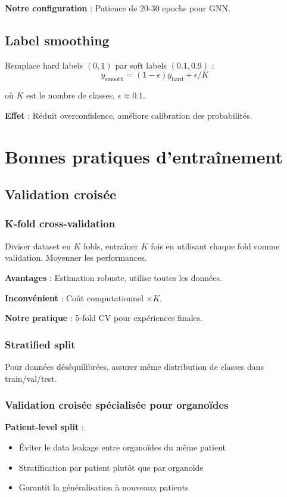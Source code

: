 \textbf{Notre configuration} : Patience de 20-30 epochs pour GNN.

\subsection{Label smoothing}

Remplace hard labels $(0, 1)$ par soft labels $(0.1, 0.9)$ :
\[
y_{\text{smooth}} = (1 - \epsilon) y_{\text{hard}} + \epsilon / K
\]

où $K$ est le nombre de classes, $\epsilon \approx 0.1$.

\textbf{Effet} : Réduit overconfidence, améliore calibration des probabilités.

\section{Bonnes pratiques d'entraînement}

\subsection{Validation croisée}

\subsubsection{K-fold cross-validation}

Diviser dataset en $K$ folds, entraîner $K$ fois en utilisant chaque fold comme validation. Moyenner les performances.

\textbf{Avantages} : Estimation robuste, utilise toutes les données.

\textbf{Inconvénient} : Coût computationnel $\times K$.

\textbf{Notre pratique} : 5-fold CV pour expériences finales.

\subsubsection{Stratified split}

Pour données déséquilibrées, assurer même distribution de classes dans train/val/test.

\subsubsection{Validation croisée spécialisée pour organoïdes}

\textbf{Patient-level split} :
\begin{itemize}
    \item Éviter le data leakage entre organoïdes du même patient
    \item Stratification par patient plutôt que par organoïde
    \item Garantit la généralisation à nouveaux patients
\end{itemize}

